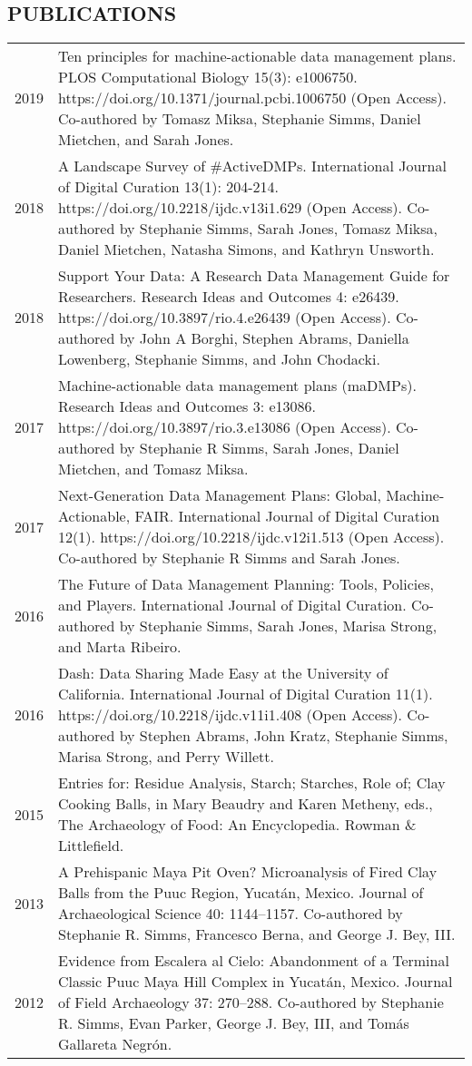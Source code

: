 \documentclass[10pt,centered]{res} %
\begin{document}
\begin{resume}
\section{\color{ResumeBlue}PUBLICATIONS}
\begin{tabular}{p{.5in}p{5.25in}<{\raggedright\arraybackslash}}
2019 & Ten principles for machine-actionable data management plans. PLOS Computational Biology 15(3): e1006750. https://doi.org/10.1371/journal.pcbi.1006750 (Open Access). Co-authored by Tomasz Miksa, Stephanie Simms, Daniel Mietchen, and Sarah Jones. \\
2018 & A Landscape Survey of \#ActiveDMPs. International Journal of Digital Curation 13(1): 204-214. https://doi.org/10.2218/ijdc.v13i1.629 (Open Access). Co-authored by Stephanie Simms, Sarah Jones, Tomasz Miksa, Daniel Mietchen, Natasha Simons, and Kathryn Unsworth. \\
2018 & Support Your Data: A Research Data Management Guide for Researchers. Research Ideas and Outcomes 4: e26439. https://doi.org/10.3897/rio.4.e26439 (Open Access). Co-authored by John A Borghi, Stephen Abrams, Daniella Lowenberg, Stephanie Simms, and John Chodacki. \\
2017 & Machine-actionable data management plans (maDMPs). Research Ideas and Outcomes 3: e13086. https://doi.org/10.3897/rio.3.e13086 (Open Access). Co-authored by Stephanie R Simms, Sarah Jones, Daniel Mietchen, and Tomasz Miksa. \\
2017 & Next-Generation Data Management Plans: Global, Machine-Actionable, FAIR. International Journal of Digital Curation 12(1). https://doi.org/10.2218/ijdc.v12i1.513 (Open Access). Co-authored by Stephanie R Simms and Sarah Jones. \\
2016 & The Future of Data Management Planning: Tools, Policies, and Players. International Journal of Digital Curation. Co-authored by Stephanie Simms, Sarah Jones, Marisa Strong, and Marta Ribeiro. \\
2016 & Dash: Data Sharing Made Easy at the University of California. International Journal of Digital Curation 11(1). https://doi.org/10.2218/ijdc.v11i1.408 (Open Access). Co-authored by Stephen Abrams, John Kratz, Stephanie Simms, Marisa Strong, and Perry Willett. \\
2015 & Entries for: Residue Analysis, Starch; Starches, Role of; Clay Cooking Balls, in Mary Beaudry and Karen Metheny, eds., The Archaeology of Food: An Encyclopedia. Rowman \& Littlefield. \\
2013 & A Prehispanic Maya Pit Oven? Microanalysis of Fired Clay Balls from the Puuc
Region, Yucat\'{a}n, Mexico. Journal of Archaeological Science 40: 1144--1157. Co-authored by Stephanie R. Simms, Francesco Berna, and George J. Bey, III. \\
2012 & Evidence from Escalera al Cielo: Abandonment of a Terminal Classic Puuc Maya Hill
Complex in Yucat\'{a}n, Mexico. Journal of Field Archaeology 37: 270--288. Co-authored by Stephanie R. Simms, Evan Parker, George J. Bey, III, and Tom\'{a}s Gallareta Negr\'{o}n. \\
\end{tabular}


\end{resume}
\end{document}
